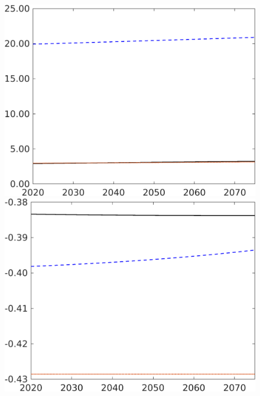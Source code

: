 \begin{figure}[h!!]
\begin{minipage}[]{0.32\textwidth}
	\end{minipage}
	\begin{minipage}[]{0.32\textwidth}
		\includegraphics[width=1\textwidth]{../../codding_model/own_basedOnFried/optimalPol_elastS_DisuSci/figures/all_1705/Extern_CompEff_pf_spillover0_noskill0_sep1_BN0_ineq0_red0_etaa0.79_lgd0.png}
	\end{minipage}
	\begin{minipage}[]{0.32\textwidth}
		\includegraphics[width=1\textwidth]{../../codding_model/own_basedOnFried/optimalPol_elastS_DisuSci/figures/all_1705/Extern_CompEff_Utillab_spillover0_noskill0_sep1_BN0_ineq0_red0_etaa0.79_lgd0.png}

\end{minipage}
\end{figure}
